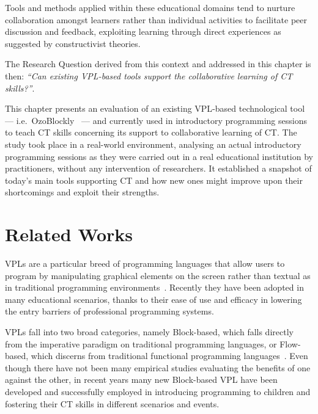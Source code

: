 Tools and methods applied within these educational domains tend to nurture collaboration amongst learners rather than individual activities to facilitate peer discussion and feedback, exploiting learning through direct experiences as suggested by constructivist theories.

The Research Question derived from this context and addressed in this chapter is then: \textit{``Can existing \ac{VPL}-based tools support the collaborative learning of \ac{CT} skills?''}.

This chapter presents an evaluation of an existing \ac{VPL}-based technological tool --- i.e.\ OzoBlockly~\cite{OZOB} --- and currently used in introductory programming sessions to teach \ac{CT} skills concerning its support to collaborative learning of \ac{CT}. The study took place in a real-world environment, analysing an actual introductory programming sessions as they were carried out in a real educational institution by practitioners, without any intervention of researchers. It established a snapshot of today's main tools supporting \ac{CT} and how new ones might improve upon their shortcomings and exploit their strengths.

\section{Related Works}\label{sec:rw3}
\acp{VPL} are a particular breed of programming languages that allow users to program by manipulating graphical elements on the screen rather than textual as in traditional programming environments~\cite{jost2014graphical}. Recently they have been adopted in many educational scenarios, thanks to their ease of use and efficacy in lowering the entry barriers of professional programming systems.

\acp{VPL} fall into two broad categories, namely Block-based, which falls di\-rect\-ly from the im\-per\-a\-tive par\-a\-digm on tra\-di\-tion\-al pro\-gram\-ming lan\-guages, or Flow-based, which discerns from traditional functional programming languages~\cite{mason2017block}. Even though there have not been many empirical studies evaluating the benefits of one against the other, in recent years many new Block-based \ac{VPL} have been developed and successfully employed in introducing programming to children and fostering their \ac{CT} skills in different scenarios and events.

